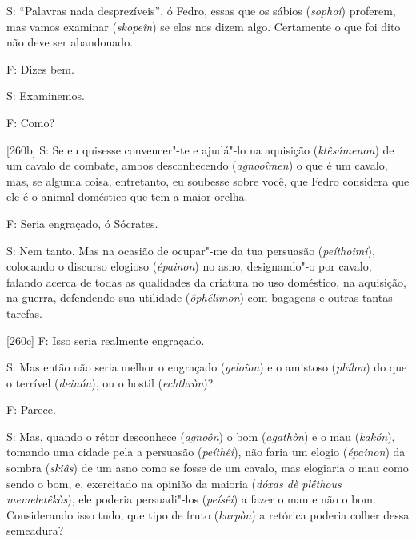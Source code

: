  

S: ``Palavras nada desprezíveis'', ó Fedro, essas que os sábios
(\emph{sophoí}) proferem, mas vamos examinar (\emph{skopeîn}) se elas
nos dizem algo. Certamente o que foi dito não deve ser abandonado.

 

F: Dizes bem.

 

S: Examinemos.

 

F: Como?

 

[260b] S: Se eu quisesse convencer"-te e ajudá"-lo na aquisição
(\emph{ktêsámenon}) de um cavalo de combate, ambos desconhecendo
(\emph{agnooîmen}) o que é um cavalo, mas, se alguma coisa, entretanto,
eu soubesse sobre você, que Fedro considera que ele é o animal doméstico
que tem a maior orelha.

 

F: Seria engraçado, ó Sócrates.

 

S: Nem tanto. Mas na ocasião de ocupar"-me da tua persuasão
(\emph{peíthoimi}), colocando o discurso elogioso (\emph{épainon}) no
asno, designando"-o por cavalo, falando acerca de todas as qualidades da
criatura no uso doméstico, na aquisição, na guerra, defendendo sua
utilidade (\emph{ôphélimon}) com bagagens e outras tantas tarefas.

 

[260c] F: Isso seria realmente engraçado.

 

S: Mas então não seria melhor o engraçado (\emph{geloîon}) e o amistoso
(\emph{phílon}) do que o terrível (\emph{deinón}), ou o hostil
(\emph{echthròn})?

 

F: Parece.

 

S: Mas, quando o rétor desconhece (\emph{agnoôn}) o bom (\emph{agathòn})
e o mau (\emph{kakón}), tomando uma cidade pela a persuasão
(\emph{peíthêi}), não faria um elogio (\emph{épainon}) da sombra
(\emph{skiâs}) de um asno como se fosse de um cavalo, mas elogiaria o
mau como sendo o bom, e, exercitado na opinião da maioria (\emph{dóxas
dè plḗthous memeletêkòs}), ele poderia persuadi"-los (\emph{peísêi}) a
fazer o mau e não o bom. Considerando isso tudo, que tipo de fruto
(\emph{karpòn}) a retórica poderia colher dessa semeadura?

 

